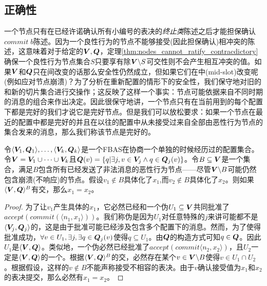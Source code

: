 \subsection{正确性}\label{sec:scp_correct}

一个节点只有在已经许诺确认所有小编号的表决的\textit{终止类}陈述之后才能担保确认$commit\;b$陈述。因为一个良性行为的节点不能够接受(因此担保确认)相冲突的陈述，这意味着对于给定的${\bm V},{\bm Q}$，定理\ref{thm:nodes_cannot_ratify_contracdictory}确保一个良性行为节点集合$S$只要享有除${\bm V}\backslash S${\quorum}可交性则不会产生相互冲突的值。如果${\bm V}$和${\bm Q}$只在{\slot}间改变的话那么安全性仍然成立，但如果它们在{\slot}中(mid-slot)改变呢(例如应对节点崩溃)？为了分析在重新配置的情形下的安全性，我们保守地对旧的和新的{\quorum}切片集合进行交操作；这反映了这样一个事实：节点可能依据来自不同时期的消息的组合来作出决定。因此很保守地讲，一个节点只有在当前{\slot}用到的每个配置下都是完好的我们才说它是完好节点。但是我们可以放松要求：如果一个节点在最近的配置中都是完好的并且在以往的配置中从未接受过来自全部由恶性行为节点的{\vblock}集合发来的消息，那么我们称该节点是完好的。

\begin{theorem}\label{thm:reconf_consistent}
        令$\langle {\bm V_1},{\bm Q_1}\rangle,\ldots,\langle {\bm V_k},{\bm Q_k}\rangle$是一个FBAS在协商一个单独{\slot}的时候经历过的配置集合。令${\bm V}={\bm V_1}\cup \cdots\cup {\bm V_k}$且${\bm Q}(v)=\left\{q|\exists j, v\in{\bm V_j}\wedge q\in{\bm Q}_j(v)\right\}$。令$B\subseteq{\bm V}$是一个集合，满足$B$包含所有已经发送了非法消息的恶性行为节点——尽管${\bm V}\backslash B$可能仍然包含崩溃(不响应)的节点。假设$v_1\not\in B$具体化了$x_1$,而$v_2\not\in B$具体化了$x_2$。则如果$\langle{\bm V},{\bm Q}\rangle^{B}$有{\quorum}交，那么$x_1=x_2$。
\end{theorem}

\begin{proof}
        为了让$v_1$产生具体的$x_1$，它必然已经和一个伪{\quorum}$U_1\subseteq{\bm V}$共同批准了$accept(commit(\langle n_1,x_1\rangle))$。我们称伪{\quorum}是因为$U_1$对任意特殊的$j$来讲可能都不是$\langle{\bm V}_j,{\bm Q}_j\rangle$的{\quorum}{}，这是由于批准可能已经涉及包含多个配置下的消息。然而，为了使得批准成功，$\forall v\in U_1,\exists j, \exists q\in{\bm Q}_j(v)$使得$q\subseteq U_1$。由${\bm Q}$的构造方式可知$q\in{\bm Q}$。因此$U_1$是$\langle{\bm V},{\bm Q}\rangle$。类似地，一个伪{\quorum}必然已经批准了$accept(commit\langle n_2,x_2\rangle)$，且$U_2$一定是$\langle{\bm V},{\bm Q}\rangle$的一个{\quorum}。根据$\langle{\bm V},{\bm Q}\rangle^{B}$的{\quorum}交，必然存在某个$v\in {\bm V}\backslash B$使得$v\in U_1\cap U_2$。根据假设，这样的$v\not\in B$不能声称接受不相容的表决。由于$v$确认接受值为$x_1$和$x_2$的表决提交，那么必然有$x_1=x_2$。
\end{proof}

